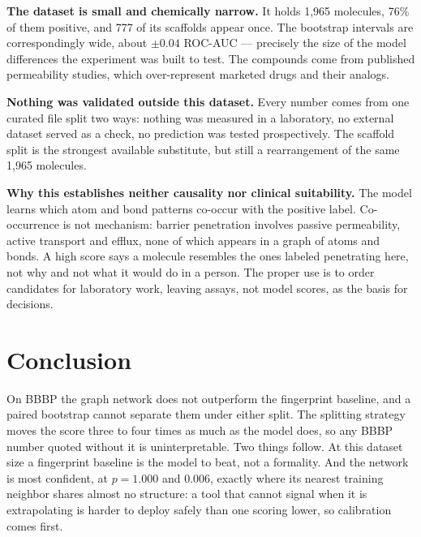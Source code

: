\documentclass[11pt,a4paper]{article}
\begin{document}
\textbf{The dataset is small and chemically narrow.} It holds 1,965 molecules, 76\% of them positive,
and 777 of its scaffolds appear once. The bootstrap intervals are correspondingly wide, about $\pm 0.04$
ROC-AUC --- precisely the size of the model differences the experiment was built to test. The compounds
come from published permeability studies, which over-represent marketed drugs and their analogs.

\textbf{Nothing was validated outside this dataset.} Every number comes from one curated file split two
ways: nothing was measured in a laboratory, no external dataset served as a check, no prediction was
tested prospectively. The scaffold split is the strongest available substitute, but still a rearrangement
of the same 1,965 molecules.

\textbf{Why this establishes neither causality nor clinical suitability.} The model learns which atom
and bond patterns co-occur with the positive label. Co-occurrence is not mechanism: barrier penetration
involves passive permeability, active transport and efflux, none of which appears in a graph of atoms and
bonds. A high score says a molecule resembles the ones labeled penetrating here, not why and not what it
would do in a person. The proper use is to order candidates for laboratory work, leaving assays, not
model scores, as the basis for decisions.

\section{Conclusion}

On BBBP the graph network does not outperform the fingerprint baseline, and a paired bootstrap cannot
separate them under either split. The splitting strategy moves
the score three to four times as much as the model does, so any BBBP number quoted without it is
uninterpretable. Two things follow. At this dataset size a fingerprint baseline is the model to beat, not
a formality. And the network is most confident, at $p = 1.000$ and $0.006$, exactly where its nearest
training neighbor shares almost no structure: a tool that cannot signal when it is extrapolating is
harder to deploy safely than one scoring lower, so calibration comes first.
\end{document}
